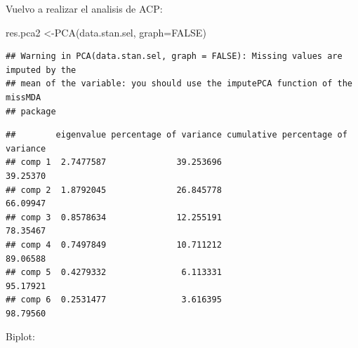 \documentclass[
]{book}
\newenvironment{Shaded}{\begin{snugshade}}{\end{snugshade}}
\newcommand{\AttributeTok}[1]{\textcolor[rgb]{0.77,0.63,0.00}{#1}}
\newcommand{\CommentTok}[1]{\textcolor[rgb]{0.56,0.35,0.01}{\textit{#1}}}
\newcommand{\ConstantTok}[1]{\textcolor[rgb]{0.00,0.00,0.00}{#1}}
\newcommand{\DecValTok}[1]{\textcolor[rgb]{0.00,0.00,0.81}{#1}}
\newcommand{\FunctionTok}[1]{\textcolor[rgb]{0.00,0.00,0.00}{#1}}
\newcommand{\NormalTok}[1]{#1}
\newcommand{\OtherTok}[1]{\textcolor[rgb]{0.56,0.35,0.01}{#1}}
\newcommand{\SpecialCharTok}[1]{\textcolor[rgb]{0.00,0.00,0.00}{#1}}
\newcommand{\StringTok}[1]{\textcolor[rgb]{0.31,0.60,0.02}{#1}}
\begin{document}
Vuelvo a realizar el analisis de ACP:

\begin{Shaded}
\begin{Highlighting}[]
\NormalTok{res.pca2 }\OtherTok{\textless{}{-}}\FunctionTok{PCA}\NormalTok{(data.stan.sel, }\AttributeTok{graph=}\ConstantTok{FALSE}\NormalTok{)}
\end{Highlighting}
\end{Shaded}

\begin{verbatim}
## Warning in PCA(data.stan.sel, graph = FALSE): Missing values are imputed by the
## mean of the variable: you should use the imputePCA function of the missMDA
## package
\end{verbatim}

\begin{Shaded}
\end{Shaded}

\begin{verbatim}
##        eigenvalue percentage of variance cumulative percentage of variance
## comp 1  2.7477587              39.253696                          39.25370
## comp 2  1.8792045              26.845778                          66.09947
## comp 3  0.8578634              12.255191                          78.35467
## comp 4  0.7497849              10.711212                          89.06588
## comp 5  0.4279332               6.113331                          95.17921
## comp 6  0.2531477               3.616395                          98.79560
\end{verbatim}

Biplot:

\begin{Shaded}
\end{Shaded}
\end{document}
